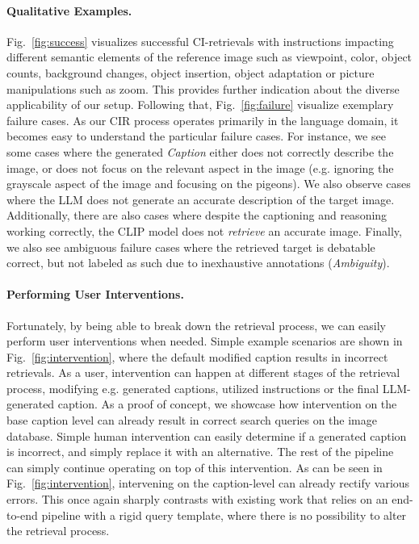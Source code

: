 \documentclass{article} \usepackage{iclr2024_conference,times}
\begin{document}
\paragraph{Qualitative Examples.} Fig.~\ref{fig:success} visualizes successful CI-retrievals with instructions impacting different semantic elements of the reference image such as viewpoint, color, object counts, background changes, object insertion, object adaptation or picture manipulations such as zoom. This provides further indication about the diverse applicability of our setup.
Following that, Fig.~\ref{fig:failure} visualize exemplary failure cases. As our CIR process operates primarily in the language domain, it becomes easy to understand the particular failure cases. For instance, we see some cases where the generated \textit{Caption} either does not correctly describe the image, or does not focus on the relevant aspect in the image (e.g. ignoring the grayscale aspect of the image and focusing on the pigeons). We also observe cases where the LLM does not generate an accurate description of the target image. Additionally, there are also cases where despite the captioning and reasoning working correctly, the CLIP model does not \textit{retrieve} an accurate image. Finally, we also see ambiguous failure cases where the retrieved target is debatable correct, but not labeled as such due to inexhaustive annotations (\textit{Ambiguity}).

\paragraph{Performing User Interventions.} Fortunately, by being able to break down the retrieval process, we can easily perform user interventions when needed. Simple example scenarios are shown in Fig.~\ref{fig:intervention}, where the default modified caption results in incorrect retrievals. As a user, intervention can happen at different stages of the retrieval process, modifying e.g. generated captions, utilized instructions or the final LLM-generated caption.
As a proof of concept, we showcase how intervention on the base caption level can already result in correct search queries on the image database. Simple human intervention can easily determine if a generated caption is incorrect, and simply replace it with an alternative. The rest of the pipeline can simply continue operating on top of this intervention. As can be seen in Fig.~\ref{fig:intervention}, intervening on the caption-level can already rectify various errors. This once again sharply contrasts with existing work that relies on an end-to-end pipeline with a rigid query template, where there is no possibility to alter the retrieval process.  
\end{document}
